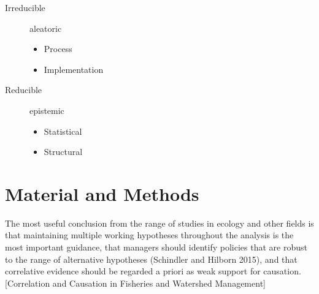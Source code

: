 \documentclass[%
nonumbib,      %
%
]{nrc1}                          %
\begin{document}
\begin{description}
\item[Irreducible] aleatoric
\begin{itemize}
 \item Process
 \item Implementation
\end{itemize}
\item[Reducible] epistemic
\begin{itemize}
 \item  Statistical
 \item  Structural
\end{itemize}
\end{description}



\section*{Material and Methods}

The most useful conclusion from the range of studies in ecology and other fields is that maintaining multiple working hypotheses throughout the analysis is the most important guidance, that managers should identify policies that are robust to the range of alternative hypotheses (Schindler and Hilborn 2015), and that correlative evidence should be regarded a priori as weak support for causation. [Correlation and Causation in Fisheries and Watershed Management]
\end{document}
